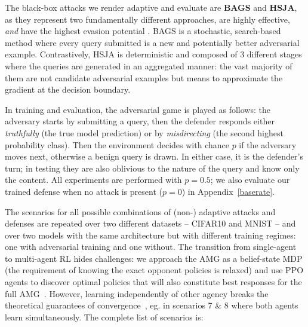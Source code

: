 The black-box attacks we render adaptive and evaluate are \textbf{BAGS} and \textbf{HSJA}, as they represent two fundamentally different approaches, are highly effective, \emph{and} have the highest evasion potential \cite{li2022blacklight}.
BAGS is a stochastic, search-based method where every query submitted is a new and potentially better adversarial example.
Contrastively, HSJA is deterministic and composed of 3 different stages where the queries are generated in an aggregated manner: the vast majority of them are not candidate adversarial examples but means to approximate the gradient at the decision boundary.

In training and evaluation, the adversarial game is played as follows: the adversary starts by submitting a query, then the defender responds either \emph{truthfully} (the true model prediction) or by \emph{misdirecting} (the second highest probability class).
Then the environment decides with chance $p$ if the adversary moves next, otherwise a benign query is drawn.
In either case, it is the defender's turn; in testing they are also oblivious to the nature of the query and know only the content.
All experiments are performed with $p=0.5$; we also evaluate our trained defense when no attack is present ($p=0$) in Appendix~\ref{baserate}.

The scenarios for all possible combinations of (non-) adaptive attacks and defenses are repeated over two different datasets -- CIFAR10 and MNIST -- and over two models with the same architecture but with different training regimes: one with adversarial training and one without.
The transition from single-agent to multi-agent \gls{RL} hides challenges: we approach the AMG as a belief-state MDP (the requirement of knowing the exact opponent policies is relaxed) and use PPO \cite{schulman2017proximal} agents to discover optimal policies that will also constitute best responses for the full AMG~\cite{wen2019probabilistic}.
However, learning independently of other agency breaks the theoretical guarantees of convergence~\cite{tuyls2012multiagent}, eg. in scenarios 7 \& 8 where both agents learn simultaneously.
The complete list of scenarios is:

